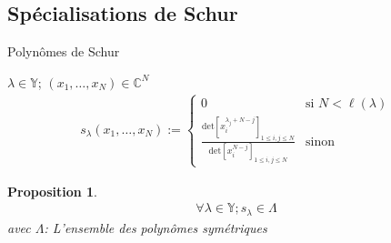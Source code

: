 \documentclass[french]{beamer}
\newtheorem{proposition}[theorem]{Proposition}
\begin{document}
\subsection{Spécialisations de Schur}
\begin{frame}{Polynômes de Schur}
\begin{definition}
$\lambda \in \mathbb{Y}$; $(x_1,\dots,x_N)\in \mathbb{C}^N$
\begin{align*}
s_\lambda(x_1,\dots,x_N):=
\begin{cases}
0 & \text{si } N<\ell(\lambda)
\\ \frac{\mathrm{det}[x_{i}^{\lambda_j+N-j}]_{1\leq i,j\leq N}}{\mathrm{det}[x_{i}^{N-j}]_{1\leq i,j\leq N}} & \text{sinon}
\end{cases}
\end{align*}
\end{definition}
\begin{proposition}
\begin{align*}
\forall \lambda \in \mathbb{Y}; s_\lambda\in \Lambda
\end{align*}
avec $\Lambda $: L'ensemble des polynômes symétriques 
\end{proposition}
\end{frame}
\end{document}
